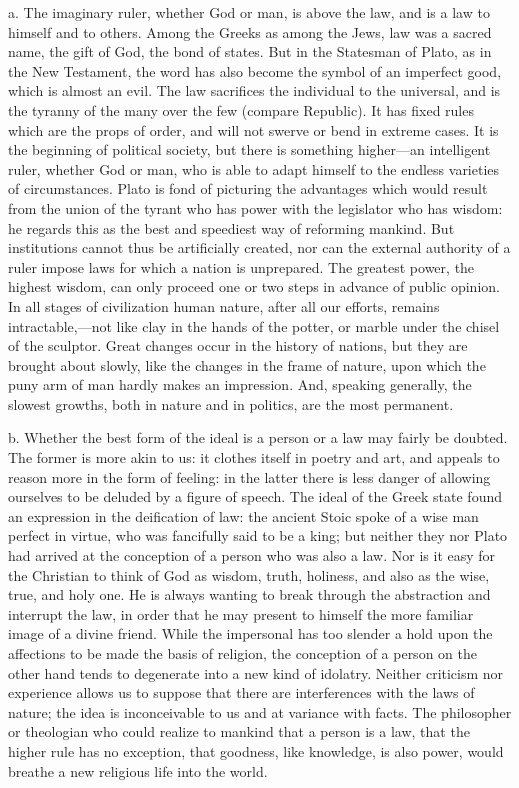 \documentclass[11pt,letter]{article}
\begin{document}
\par  a. The imaginary ruler, whether God or man, is above the law, and is a law to himself and to others. Among the Greeks as among the Jews, law was a sacred name, the gift of God, the bond of states. But in the Statesman of Plato, as in the New Testament, the word has also become the symbol of an imperfect good, which is almost an evil. The law sacrifices the individual to the universal, and is the tyranny of the many over the few (compare Republic). It has fixed rules which are the props of order, and will not swerve or bend in extreme cases. It is the beginning of political society, but there is something higher—an intelligent ruler, whether God or man, who is able to adapt himself to the endless varieties of circumstances. Plato is fond of picturing the advantages which would result from the union of the tyrant who has power with the legislator who has wisdom: he regards this as the best and speediest way of reforming mankind. But institutions cannot thus be artificially created, nor can the external authority of a ruler impose laws for which a nation is unprepared. The greatest power, the highest wisdom, can only proceed one or two steps in advance of public opinion. In all stages of civilization human nature, after all our efforts, remains intractable,—not like clay in the hands of the potter, or marble under the chisel of the sculptor. Great changes occur in the history of nations, but they are brought about slowly, like the changes in the frame of nature, upon which the puny arm of man hardly makes an impression. And, speaking generally, the slowest growths, both in nature and in politics, are the most permanent.

\par  b. Whether the best form of the ideal is a person or a law may fairly be doubted. The former is more akin to us: it clothes itself in poetry and art, and appeals to reason more in the form of feeling: in the latter there is less danger of allowing ourselves to be deluded by a figure of speech. The ideal of the Greek state found an expression in the deification of law: the ancient Stoic spoke of a wise man perfect in virtue, who was fancifully said to be a king; but neither they nor Plato had arrived at the conception of a person who was also a law. Nor is it easy for the Christian to think of God as wisdom, truth, holiness, and also as the wise, true, and holy one. He is always wanting to break through the abstraction and interrupt the law, in order that he may present to himself the more familiar image of a divine friend. While the impersonal has too slender a hold upon the affections to be made the basis of religion, the conception of a person on the other hand tends to degenerate into a new kind of idolatry. Neither criticism nor experience allows us to suppose that there are interferences with the laws of nature; the idea is inconceivable to us and at variance with facts. The philosopher or theologian who could realize to mankind that a person is a law, that the higher rule has no exception, that goodness, like knowledge, is also power, would breathe a new religious life into the world.
\end{document}
